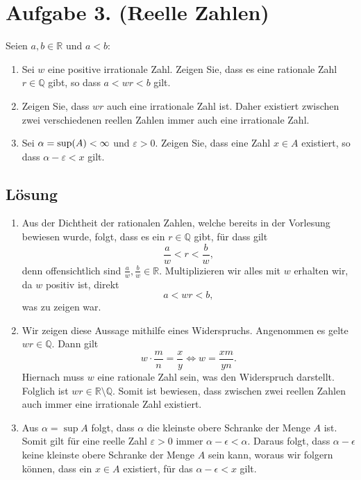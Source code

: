 \documentclass[german,12pt]{homework}
\newcommand{\QQ}{\mathbb{Q}}
\newcommand{\RR}{\mathbb{R}}
\DeclarePairedDelimiter{\enbrace}{(}{)}
\begin{document}
    \section*{Aufgabe 3. (Reelle Zahlen)}

    \begin{problem}
        Seien \(a, b \in \RR\) und \(a < b\):
        \begin{enumerate}
            \item Sei \(w\) eine positive irrationale Zahl. Zeigen Sie, dass es eine rationale Zahl \(r \in \QQ\) gibt, so dass \(a < wr < b\) gilt.
            \item Zeigen Sie, dass \(wr\) auch eine irrationale Zahl ist. Daher existiert zwischen zwei verschiedenen reellen Zahlen immer auch eine irrationale Zahl.
            \item Sei \(\alpha = \sup\enbrace*{A} < \infty\) und \(\varepsilon > 0\). Zeigen Sie, dass eine Zahl \(x \in A\) existiert, so dass \(\alpha - \varepsilon < x\) gilt.
        \end{enumerate}
    \end{problem}

    \subsection*{Lösung}
    \begin{enumerate}
        \item Aus der Dichtheit der rationalen Zahlen, welche bereits in der Vorlesung bewiesen wurde, folgt, dass es ein \(r \in \QQ\) gibt, für dass gilt
        \[\frac{a}{w} < r < \frac{b}{w},\]
        denn offensichtlich sind \(\frac{a}{w}, \frac{b}{w} \in \RR\). Multiplizieren wir alles mit \(w\) erhalten wir, da \(w\) positiv ist, direkt
        \[a < wr < b,\] was zu zeigen war.
        \item Wir zeigen diese Aussage mithilfe eines Widerspruchs. Angenommen es gelte \(wr \in \QQ\). Dann gilt
        \[w \cdot \frac{m}{n} = \frac{x}{y} \iff w = \frac{xm}{yn}.\]
        Hiernach muss \(w\) eine rationale Zahl sein, was den Widerspruch darstellt. Folglich ist \(wr \in \RR \setminus \QQ\). Somit ist bewiesen, dass zwischen zwei reellen Zahlen auch immer eine irrationale Zahl existiert.
        \item Aus \(\alpha = \sup{A}\) folgt, dass \(\alpha\) die kleinste obere Schranke der Menge \(A\) ist. Somit gilt für eine reelle Zahl \(\varepsilon > 0\) immer \(\alpha - \epsilon < \alpha\). Daraus folgt, dass \( \alpha - \epsilon\) keine kleinste obere Schranke der Menge \(A\) sein kann, woraus wir folgern können, dass ein \(x \in A\) existiert, für das \(\alpha - \epsilon < x\) gilt.
    \end{enumerate}
\end{document}

